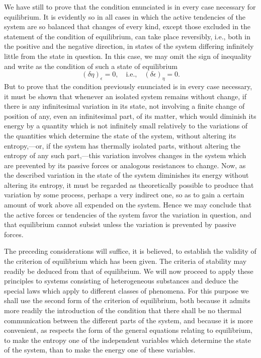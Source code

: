 \documentclass[11pt]{article}
\newcommand{\eps}{\epsilon}
\begin{document}
We have still to prove that the condition enunciated is in every case necessary for equilibrium. It is evidently so in all cases in which the active tendencies of the system are so balanced that changes of every kind, except those excluded in the statement of the condition of equilibrium, can take place reversibly, i.e., both in the positive and the negative direction, in states of the system differing infinitely little from the state in question. In this case, we may omit the sign of inequality and write as the condition of such a state of equilibrium
\begin{equation}
(\delta\eta)_{\eps}=0,\quad \text{i.e.,}\quad (\delta\eps)_{\eta}=0.
\end{equation}
But to prove that the condition previously enunciated is in every case necessary, it must be shown that whenever an isolated system remains without change, if there is any infinitesimal variation in its state, not involving a finite change of position of any, even an infinitesimal part, of its matter, which would diminish its energy by a quantity which is not infinitely small relatively to the variations of the quantities which determine the state of the system, without altering its entropy,—or, if the system has thermally isolated parts, without altering the entropy of any such part,—this variation involves changes in the system which are prevented by its passive forces or analogous resistances to change. Now, as the described variation in the state of the system diminishes its energy without altering its entropy, it must be regarded as theoretically possible to produce that variation by some process, perhaps a very indirect one, so as to gain a certain amount of work above all expended on the system. Hence we may conclude that the active forces or tendencies of the system favor the variation in question, and that equilibrium cannot subsist unless the variation is prevented by passive forces.

The preceding considerations will suffice, it is believed, to establish the validity of the criterion of equilibrium which has been given. The criteria of stability may readily be deduced from that of equilibrium. We will now proceed to apply these principles to systems consisting of heterogeneous substances and deduce the special laws which apply to different classes of phenomena. For this purpose we shall use the second form of the criterion of equilibrium, both because it admits more readily the introduction of the condition that there shall be no thermal communication between the different parts of the system, and because it is more convenient, as respects the form of the general equations relating to equilibrium, to make the entropy one of the independent variables which determine the state of the system, than to make the energy one of these variables.
\end{document}
